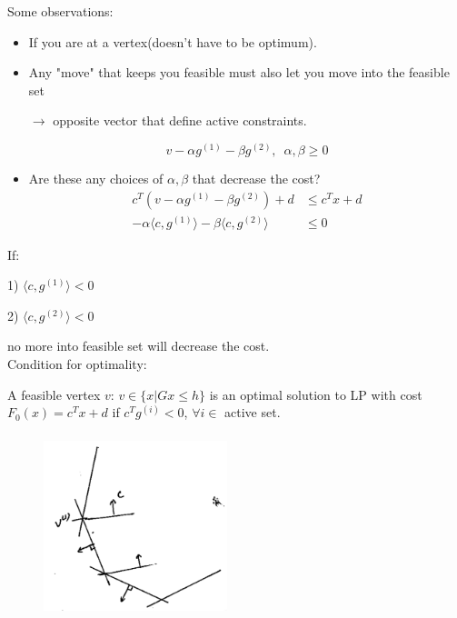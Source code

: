 \vspace{0.5cm}
Some observations:
\begin{itemize}
	\item If you are at a vertex(doesn't have to be optimum). 
	
	\item Any "move" that keeps you feasible must also let you move into the feasible set 
	
	$\rightarrow$ opposite vector that define active constraints.
	
	\begin{equation*}
		v - \alpha g^{(1)} - \beta g^{(2)}, \,\,\, \alpha, \beta \geq 0
	\end{equation*}
	
	\item Are these any choices of $\alpha, \beta$ that decrease the cost?
	\begin{align*}
		c^T(v - \alpha g^{(1)} - \beta g^{(2)}) + d &\leq c^Tx + d\\
		-\alpha \langle c, g^{(1)}\rangle  - \beta \langle c, g^{(2)}\rangle &\leq 0
	\end{align*}
\end{itemize}

If:

1) $\langle c, g^{(1)}\rangle < 0$

2) $\langle c, g^{(2)}\rangle < 0$

no more into feasible set will decrease the cost.\\ 

\vspace{0.5cm}
Condition for optimality:

A feasible vertex $v$: $v\in\{x|Gx \leq h \}$ is an optimal solution to LP with cost $F_0(x) = c^Tx + d$ if $c^Tg^{(i)} < 0$, $\forall i\in$ active set.\\

\begin{figure}
	\centering
	\includegraphics[width=2.1in,height=2.1in]{figures/ch07/figure1012_9.png}
\end{figure}


